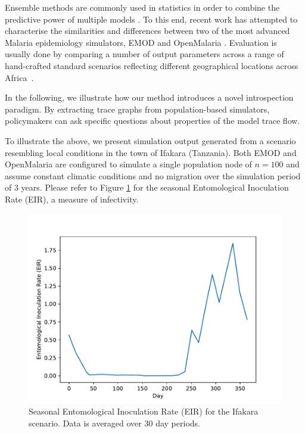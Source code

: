 \documentclass{article}
\begin{document}
Ensemble methods are commonly used in statistics in order to combine the predictive power of multiple models \cite{cameron2015defining,smith_ensemble_2012}. To this end, recent work has attempted to characterise the similarities and differences between two of the most advanced Malaria epidemiology simulators, EMOD \cite{bershteyn2018implementation} and OpenMalaria \cite{smith2008towards}. Evaluation is usually done by comparing a number of output parameters across a range of hand-crafted standard scenarios reflecting different geographical locations across Africa~\cite{smith_ensemble_2012}.

In the following, we illustrate how our method introduces a novel introspection paradigm. By extracting trace graphs from population-based simulators, policymakers can ask specific questions about properties of the model trace flow. 

To illustrate the above, we present simulation output generated from a scenario resembling local conditions in the town of Ifakara (Tanzania). Both EMOD and OpenMalaria are configured to simulate a single population node of $n=100$ and assume constant climatic conditions and no migration over the simulation period of $3$ years. Please refer to Figure \ref{fig:EIR} for the seasonal Entomological Inoculation Rate (EIR), a measure of infectivity.

\begin{figure}[h!]
  \centering
  \includegraphics[width=\textwidth/2]{../plots/EIR_Ifakara.pdf}
  \caption{Seasonal Entomological Inoculation Rate (EIR) for the Ifakara scenario. Data is averaged over $30$ day periods.}
  \label{fig:EIR}
\end{figure}
\end{document}
